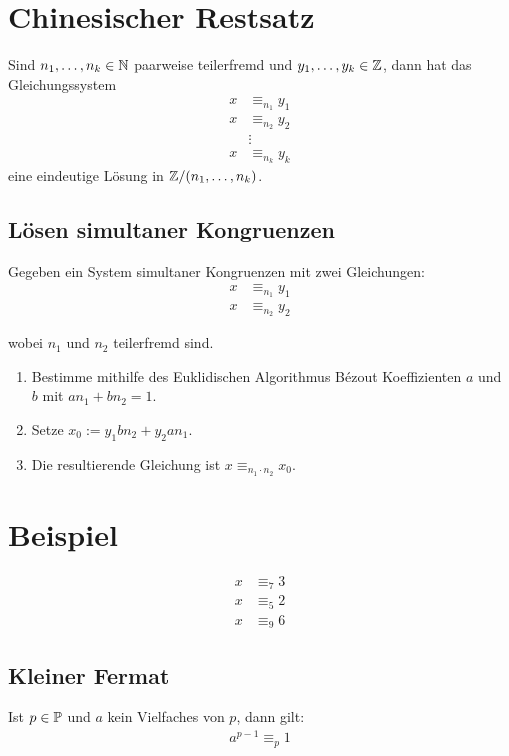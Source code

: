 \section{Chinesischer Restsatz}
Sind $n_1, \ldots, n_k \in \mathbb{N}$ paarweise teilerfremd und $y_1, \ldots, y_k \in \mathbb{Z}$, dann
hat das Gleichungssystem
\begin{align*}
	x & \equiv_{n_1} y_1 \\
	x & \equiv_{n_2} y_2 \\
	  & \vdots           \\
	x & \equiv_{n_k} y_k
\end{align*}
eine eindeutige Lösung in $\mathbb{Z}/(n_1, \ldots,n_k)$.
\subsection{Lösen simultaner Kongruenzen}

Gegeben ein System simultaner Kongruenzen mit zwei Gleichungen:
\begin{align*}
	x & \equiv_{n_1} y_1 \\
	x & \equiv_{n_2} y_2
\end{align*}

\noindent wobei $n_1$ und $n_2$ teilerfremd sind.
\begin{enumerate}
	\item Bestimme mithilfe des Euklidischen Algorithmus Bézout Koeffizienten $a$ und $b$ mit $an_1 + bn_2 = 1$.
	\item Setze $x_0 := y_1bn_2 + y_2an_1$.
	\item Die resultierende Gleichung ist $x \equiv_{n_1 \cdot n_2} x_0$.
\end{enumerate}
\section{Beispiel}
\begin{align*}
    x & \equiv_7 3 \\
    x & \equiv_5 2 \\
    x & \equiv_9 6
\end{align*}
\subsection{Kleiner Fermat}
Ist $p \in \mathbb{P}$ und $a$ kein Vielfaches von $p$, dann gilt:
\begin{align*}
    a^{p-1} \equiv_p 1
\end{align*}
